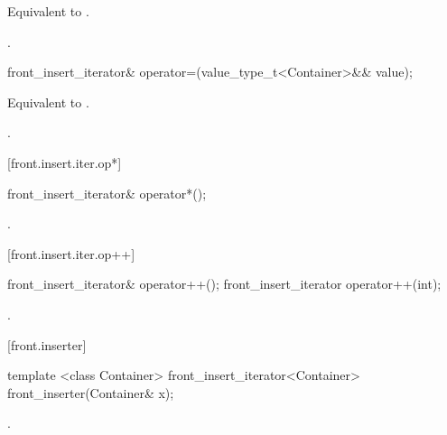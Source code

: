 \begin{itemdescr}
\pnum
\effects Equivalent to
.

\pnum
\returns
{}.
\end{itemdescr}

%
\begin{itemdecl}
front_insert_iterator&
  operator=(value_type_t<Container>&& value);
\end{itemdecl}

\begin{itemdescr}
\pnum
\effects Equivalent to
.

\pnum
\returns
{}.
\end{itemdescr}

[front.insert.iter.op*]{}

%
\begin{itemdecl}
front_insert_iterator& operator*();
\end{itemdecl}

\begin{itemdescr}
\pnum
\returns
{}.
\end{itemdescr}

[front.insert.iter.op++]{}

%
\begin{itemdecl}
front_insert_iterator& operator++();
front_insert_iterator operator++(int);
\end{itemdecl}

\begin{itemdescr}
\pnum
\returns
{}.
\end{itemdescr}

[front.inserter]{}

%
\begin{itemdecl}
template <class Container>
  front_insert_iterator<Container> front_inserter(Container& x);
\end{itemdecl}

\begin{itemdescr}
\pnum
\returns
{}.
\end{itemdescr}

